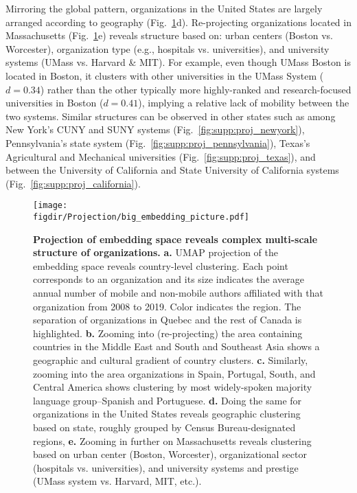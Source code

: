 \documentclass[12pt]{article} %
\def\figdir{../Figs}
\begin{document}
Mirroring the global pattern, organizations in the United States are largely arranged according to geography (Fig.~\ref{fig:projection}d).
Re-projecting organizations located in Massachusetts (Fig.~\ref{fig:projection}e) reveals structure based on: urban centers (Boston vs. Worcester), organization type (e.g., hospitals vs. universities), and university systems (UMass vs. Harvard \& MIT).
For example, even though UMass Boston is located in Boston, it clusters with  other universities in the UMass System ($d = 0.34$) rather than the other typically more highly-ranked and research-focused universities in Boston ($d = 0.41$), implying a relative lack of mobility between the two systems.
Similar structures can be observed in other states such as among New York's CUNY and SUNY systems (Fig.~\ref{fig:supp:proj_newyork}), Pennsylvania's state system (Fig.~\ref{fig:supp:proj_pennsylvania}), Texas's Agricultural and Mechanical universities (Fig.~\ref{fig:supp:proj_texas}), and between the University of California and State University of California systems (Fig.~\ref{fig:supp:proj_california}).

%
%
\begin{figure}[hp!]
	\centering
	\texttt{[image: \\figdir/Projection/big\_embedding\_picture.pdf]}
	\caption{
		\textbf{Projection of embedding space reveals complex multi-scale structure of organizations.}
		\textbf{a.}
		UMAP projection \autocite{mcinnes2018umap} of the embedding space reveals country-level clustering.
		Each point corresponds to an organization and its size indicates the average annual number of mobile and non-mobile authors affiliated with that organization from 2008 to 2019.
		Color indicates the region.
		The separation of organizations in Quebec and the rest of Canada is highlighted. 
		\textbf{b.} Zooming into (re-projecting) the area containing countries in the Middle East and South and Southeast Asia shows a geographic and cultural gradient of country clusters.
		\textbf{c.} Similarly, zooming into the area organizations in Spain, Portugal, South, and Central America shows clustering by most widely-spoken majority language group--Spanish and Portuguese.
		\textbf{d.} Doing the same for organizations in the United States reveals geographic clustering based on state, roughly grouped by Census Bureau-designated regions,
		\textbf{e.} Zooming in further on Massachusetts reveals clustering based on urban center (Boston, Worcester), organizational sector (hospitals vs. universities), and university systems and prestige (UMass system vs. Harvard, MIT, etc.).
	}
	\label{fig:projection}
\end{figure}
\end{document}
